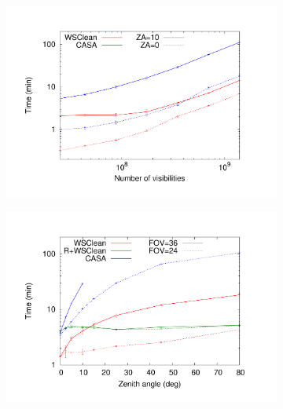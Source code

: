 \documentclass[useAMS,usenatbib]{mn2e}
\begin{document}
\begin{figure}%
\begin{subfigure}{.5\linewidth}%
\includegraphics[width=\linewidth]{img/benchmark-nsamples/nsamples}%
\caption{}\label{fig:timing-nsamples}%
\end{subfigure}%
\hspace{-.05\linewidth}\begin{subfigure}{.5\linewidth}%
\includegraphics[width=\linewidth]{img/benchmark-zenith-angle/za}%
\caption{}\label{fig:timing-zenith-angle}%
\end{subfigure}\\
\begin{subfigure}{.5\linewidth}%

\end{subfigure}
\end{figure}
\end{document}
